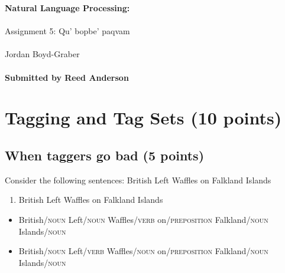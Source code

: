 \documentclass[11pt]{article}
\begin{document}
\begin{center}
{\Large{\textbf{ Natural Language Processing:  }}}\\
\mbox{}\\
{\Large{Assignment 5: Qu' bopbe' paqvam}}\\
\mbox{}\\
{\large{Jordan Boyd-Graber}}\\
\mbox{}\\
{\large{\textbf{Submitted by Reed Anderson}}}\\
\end{center}


{}



\section{Tagging and Tag Sets (10 points)}

\subsection{When taggers go bad (5 points)}

Consider the following sentences:
British Left Waffles on Falkland Islands
\begin{enumerate}
\item British Left Waffles on Falkland Islands
\end{enumerate}

\begin{itemize}
\item British/\textsc{noun} Left/\textsc{noun} Waffles/\textsc{verb} on/\textsc{preposition} Falkland/\textsc{noun} Islands/\textsc{noun}
\item British/\textsc{noun} Left/\textsc{verb} Waffles/\textsc{noun} on/\textsc{preposition} Falkland/\textsc{noun} Islands/\textsc{noun}
\end{itemize}
\end{document}
